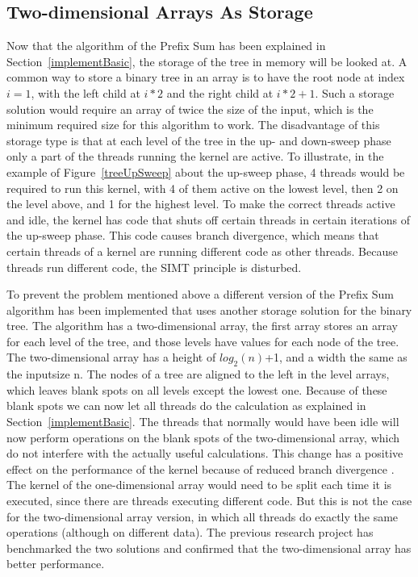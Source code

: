 \documentclass[a4paper]{article}
\begin{document}
\subsection{Two-dimensional Arrays As Storage} \label{prefixSumStorage}
Now that the algorithm of the Prefix Sum has been explained in Section~\ref{implementBasic}, the storage of the tree in memory will be looked at. A common way to store a binary tree in an array is to have the root node at index $i=1$, with the left child at $i*2$ and the right child at $i*2+1$. Such a storage solution would require an array of twice the size of the input, which is the minimum required size for this algorithm to work. The disadvantage of this storage type is that at each level of the tree in the up- and down-sweep phase only a part of the threads running the kernel are active. To illustrate, in the example of Figure~\ref{treeUpSweep} about the up-sweep phase, 4 threads would be required to run this kernel, with 4 of them active on the lowest level, then 2 on the level above, and 1 for the highest level. To make the correct threads active and idle, the kernel has code that shuts off certain threads in certain iterations of the up-sweep phase. This code causes branch divergence, which means that certain threads of a kernel are running different code as other threads. Because threads run different code, the SIMT principle is disturbed.

To prevent the problem mentioned above a different version of the Prefix Sum algorithm has been implemented that uses another storage solution for the binary tree. The algorithm has a two-dimensional array, the first array stores an array for each level of the tree, and those levels have values for each node of the tree. The two-dimensional array has a height of $log_2(n)$+1, and a width the same as the inputsize n. The nodes of a tree are aligned to the left in the level arrays, which leaves blank spots on all levels except the lowest one. Because of these blank spots we can now let all threads do the calculation as explained in Section~\ref{implementBasic}. The threads that normally would have been idle will now perform operations on the blank spots of the two-dimensional array, which do not interfere with the actually useful calculations. This change has a positive effect on the performance of the kernel because of reduced branch divergence \cite{Han:ReducingBranchDivergence}. The kernel of the one-dimensional array would need to be split each time it is executed, since there are threads executing different code. But this is not the case for the two-dimensional array version, in which all threads do exactly the same operations (although on different data). The previous research project has benchmarked the two solutions and confirmed that the two-dimensional array has better performance.
\end{document}
